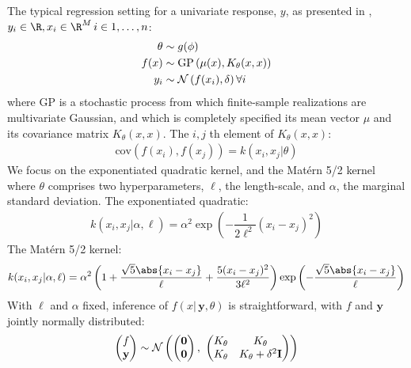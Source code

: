 \documentclass{article}
\newcommand{\lp}{\ensuremath{\left(}}
\newcommand{\rp}{\ensuremath{\right)}}
\begin{document}
The typical regression setting for a univariate response, $y$, as presented in \citet{flaxman2015fast},
$y_i \in \R, x_i \in \R^M\, i \in {1,\dots,n}$:
\begin{align*}
  \theta & \sim g(\phi) \\
  f(x) & \sim \text{GP}\lp \mu(x),
  K_\theta(x, x) \rp \\
  y_i & \sim \mathcal{N}\lp f(x_i), \delta \rp \forall i \\
\end{align*}
where $\text{GP}$ is a stochastic process from which finite-sample realizations are
multivariate Gaussian, and which is completely specified its mean vector $\mu$
and its covariance matrix $K_\theta(x, x)$. The $i, j$ th
element of $K_\theta(x, x)$:
\begin{align*}
  \text{cov}(f(x_i), f(x_j)) = k(x_i, x_j | \theta) 
\end{align*}
We focus on the exponentiated quadratic kernel, and the Mat\'{e}rn 5/2 kernel
where $\theta$ comprises two hyperparameters, $\ell$, the length-scale, and
$\alpha$, the marginal standard deviation. The exponentiated quadratic:
\begin{align} \label{kern_quad}
  k(x_i, x_j | \alpha, \ell) = \alpha^2 
\exp \left(
	- \dfrac{1}{2\ell^2} (x_{i} - x_{j})^2
\right)
\end{align}
%
The Mat\'{e}rn 5/2 kernel:
%
\begin{align} \label{kern_quad}
  k(x_i, x_j | \alpha, \ell) = \alpha^2 
	\left( 
	1 + \dfrac{\sqrt{5}\abs{x_{i} - x_{j}}}{\ell} + \dfrac{5(x_{i} - x_{j})^2}{3\ell^2}
	\right)
	\exp \left(
	- \dfrac{\sqrt{5}\abs{x_{i} - x_{j}}}{\ell} 
\right)
\end{align}
With $\ell$ and $\alpha$ fixed, inference of $f(x | \, \mathbf{y}, \theta)$ is
straightforward, with $f$ and $\mathbf{y}$ jointly normally distributed:
\begin{align*} \begin{pmatrix} f\\ \mathbf{y} \\ \end{pmatrix} \sim
\mathcal{N} \lp \begin{pmatrix} \mathbf{0} \\ \mathbf{0} \end{pmatrix} ,\,\,
  \begin{pmatrix} K_\theta &
  K_\theta  \\ K_\theta &
  K_\theta + \delta ^ 2 \mathbf{I}\\ \end{pmatrix} \rp
\end{align*}
\end{document}
